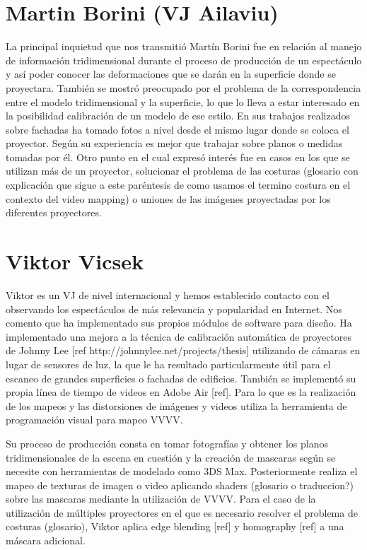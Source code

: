 \section{Martin Borini (VJ Ailaviu)}
La principal inquietud que nos transmitió Martín Borini\cite{Ailaviu} fue en relación al manejo de información tridimensional durante el proceso de producción de un espectáculo y así poder conocer las deformaciones que se darán en la superficie donde se proyectara. También se mostró preocupado por el problema de la correspondencia entre el modelo tridimensional y la superficie, lo que lo lleva a estar interesado en la posibilidad calibración de un modelo de ese estilo.
En sus trabajos realizados sobre fachadas ha tomado fotos a nivel desde el mismo lugar donde se coloca el proyector. Según su experiencia es mejor que trabajar sobre planos o medidas tomadas por él. Otro punto en el cual expresó interés fue en casos en los que se utilizan más de un proyector, solucionar el problema de las costuras (glosario con explicación que sigue a este paréntesis de como usamos el termino costura en el contexto del video mapping) o uniones de las imágenes proyectadas por los diferentes proyectores.

\section{Viktor Vicsek}
Viktor\cite{Viktorvicsek} es un VJ de nivel internacional y hemos establecido contacto con el observando los espectáculos de más relevancia y popularidad en Internet. Nos comento que ha implementado sus propios módulos de software para diseño. Ha implementado una mejora a la técnica de calibración automática de proyectores de Johnny Lee [ref http://johnnylee.net/projects/thesis] utilizando de cámaras en lugar de sensores de luz, la que le ha resultado particularmente útil para el escaneo de grandes superficies o fachadas de edificios. También se implementó su propia línea de tiempo de videos en Adobe Air [ref]. Para lo que es la realización de los mapeos y las distorsiones de imágenes y videos utiliza la herramienta de programación visual para mapeo VVVV\cite{VVVV}.

Su proceso de producción consta en tomar fotografías y obtener los planos tridimensionales de la escena en cuestión y la creación de mascaras según se necesite con herramientas de modelado como 3DS Max. Posteriormente realiza el mapeo de texturas de imagen o video aplicando shaders (glosario o traduccion?) sobre las mascaras mediante la utilización de VVVV. Para el caso de la utilización de múltiples proyectores en el que es necesario resolver el problema de costuras (glosario), Viktor aplica edge blending [ref] y homography [ref] a una máscara adicional.


